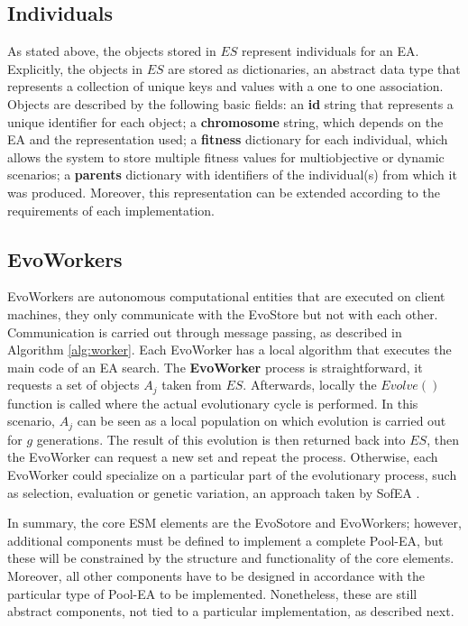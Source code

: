 

\subsection{Individuals}
As stated above, the objects stored in $ES$ represent individuals for an EA. 
Explicitly, the objects in $ES$ are stored as dictionaries, an abstract data type that represents a collection of unique keys and values with a one to one association.
Objects are described by the following basic fields:
an \textbf{id} string that represents a unique identifier for each object;
a \textbf{chromosome} string, which depends on the EA and the representation used;
a \textbf{fitness} dictionary for each individual, which allows the system to store multiple fitness values for multiobjective
or dynamic scenarios; a \textbf{parents} dictionary with identifiers of the individual(s) from which it was produced.
Moreover, this representation can be extended according to the requirements of each implementation. 



\subsection{EvoWorkers}
EvoWorkers are autonomous computational entities that are executed on client machines, they only communicate with the EvoStore but not with each other. Communication is carried out through message passing, as described in Algorithm \ref{alg:worker}. Each EvoWorker has a local algorithm that executes the main code of an EA search. The \textbf{EvoWorker} process is straightforward, it requests a set of objects $A_j$ taken from $ES$.
Afterwards, locally the $Evolve()$ function is called where the actual evolutionary cycle is performed. In this scenario, $A_j$ can be seen as a local population on which evolution is carried out for $g$ generations. The result of this evolution is then returned back into $ES$, then the EvoWorker can request a new set and repeat the process. Otherwise, each EvoWorker could specialize on a particular part of the evolutionary process, such as selection, evaluation or genetic variation,
an approach taken by SofEA \cite{sofea1}.

In summary, the core ESM elements are the EvoSotore and EvoWorkers; however, additional components must be defined to implement a complete Pool-EA, but these will be constrained by the structure and functionality of the core elements.
Moreover, all other components have to be designed in accordance with the particular type of Pool-EA to be implemented. Nonetheless, these are still abstract components, not tied to a particular implementation, as described next.

